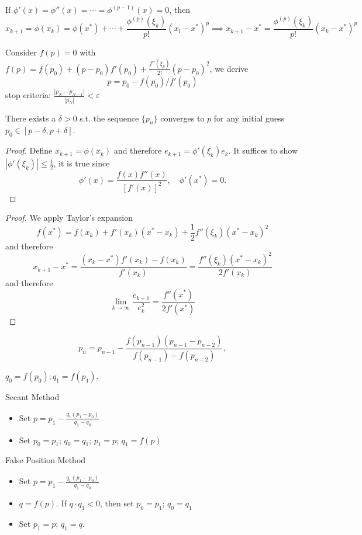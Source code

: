 \begin{remark}
If $\phi'(x)=\phi''(x)=\cdots=\phi^{(p-1)}(x)=0$, then
\[
x_{k+1}=\phi(x_k)=\phi(x^*)+\cdots+\frac{\phi^{(p)}(\xi_k)}{p!}(x_l-x^*)^p\implies
x_{k+1}-x^*=\frac{\phi^{(p)}(\xi_k)}{p!}(x_k-x^*)^p
\]

\end{remark}
\begin{definition}
Consider $f(p)=0$ with $f(p)=f(p_0)+(p-p_0)f'(p_0)+\frac{f''(\xi_p)}{2!}(p-p_0)^2$, we derive
\[
p=p_0-f(p_0)/f'(p_0)
\]
stop criteria: $\frac{|p_N-p_{N-1}|}{|p_N|}<\varepsilon$
\end{definition}
\begin{theorem}
There exists a $\delta >0$ s.t. the sequence $\{p_n\}$ converges to $p$ for any initial guess $p_0\in[p-\delta,p+\delta]$.
\end{theorem}
\begin{proof}
Define $x_{k+1}=\phi(x_k)$ and therefore $e_{k+1}=\phi'(\xi_k)e_k$. It suffices to show $|\phi'(\xi_k)|\le\frac{1}{2}$, it is true since 
\[
\phi'(x)=\frac{f(x)f''(x)}{[f'(x)]^2},\quad
\phi'(x^*)=0.
\]
\end{proof}
\begin{proof}
We apply Taylor's expansion
\[
f(x^*)=f(x_k)+f'(x_k)(x^*-x_k)+\frac{1}{2}f''(\xi_k)(x^*-x_k)^2
\]
and therefore
\[
x_{k+1}-x^*=\frac{(x_k-x^*)f'(x_k)-f(x_k)}{f'(x_k)}=\frac{f''(\xi_k)(x^*-x_k)^2}{2f'(x_k)}
\]
and therefore
\[
\lim_{k\to\infty}\frac{e_{k+1}}{e_k^2}=\frac{f''(x^*)}{2f'(x^*)}
\]

\end{proof}
\begin{definition}
\[
p_n=p_{n-1}-\frac{f(p_{n-1})(p_{n-1}-p_{n-2})}{f(p_{n-1}) - f(p_{n-2})},
\]
\end{definition}
\begin{example}
$q_0=f(p_0);q_1=f(p_1)$. 

Secant Method
\begin{itemize}
\item
Set $p=p_1-\frac{q_1(p_1-p_0)}{q_1-q_0}$
\item
Set $p_0=p_1$; $q_0=q_1$; $p_1=p$; $q_1=f(p)$
\end{itemize}
False Position Method
\begin{itemize}
\item
Set $p=p_1-\frac{q_1(p_1-p_0)}{q_1-q_0}$
\item
$q=f(p)$. If $q\cdot q_1<0$, then set $p_0=p_1$; $q_0=q_1$
\item
Set $p_1=p$; $q_1=q$.
\end{itemize}
\end{example}

